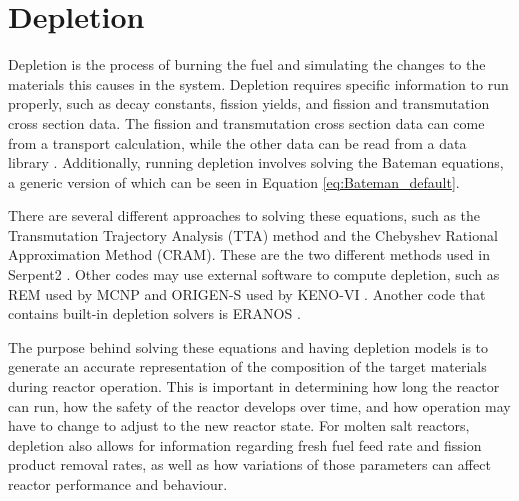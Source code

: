 \section{Depletion}

Depletion is the process of burning the fuel and simulating the changes to the materials this causes in the system. Depletion requires specific information to run properly, such as decay constants,  fission yields, and fission and transmutation cross section data. The fission and transmutation cross section data can come from a transport calculation, while the other data can be read from a data library \cite{leppanen_development_2007}. Additionally, running depletion involves solving the Bateman equations, a generic version of which can be seen in Equation \ref{eq:Bateman_default}.

There are several different approaches to solving these equations, such as the Transmutation Trajectory Analysis (TTA) method and the Chebyshev Rational Approximation Method (CRAM). These are the two different methods used in Serpent2 %
\cite{leppanen_serpent_2015}. Other codes may use external software to compute depletion, such as REM used by MCNP and ORIGEN-S used by KENO-VI \cite{aufiero_extended_2013}. Another code %
that contains built-in depletion solvers is ERANOS \cite{aufiero_extended_2013}.

The purpose behind solving these equations and having depletion models is to generate an accurate representation of the composition of the target materials during reactor operation. This is important in determining how long the reactor can run, how the safety of the reactor develops over time, and how operation may have to change to adjust to the new reactor state. For molten salt reactors, depletion also allows for information regarding fresh fuel feed rate and fission product removal rates, as well as how variations of those parameters can affect reactor performance and behaviour.






